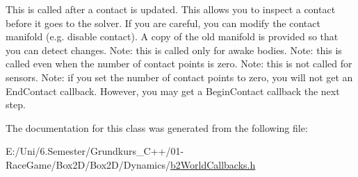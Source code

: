 This is called after a contact is updated. This allows you to inspect a contact before it goes to the solver. If you are careful, you can modify the contact manifold (e.\+g. disable contact). A copy of the old manifold is provided so that you can detect changes. Note\+: this is called only for awake bodies. Note\+: this is called even when the number of contact points is zero. Note\+: this is not called for sensors. Note\+: if you set the number of contact points to zero, you will not get an End\+Contact callback. However, you may get a Begin\+Contact callback the next step. 

The documentation for this class was generated from the following file\+:\begin{DoxyCompactItemize}
\item 
E\+:/\+Uni/6.\+Semester/\+Grundkurs\+\_\+\+C++/01-\/\+Race\+Game/\+Box2\+D/\+Box2\+D/\+Dynamics/\mbox{\hyperlink{b2_world_callbacks_8h}{b2\+World\+Callbacks.\+h}}\end{DoxyCompactItemize}
